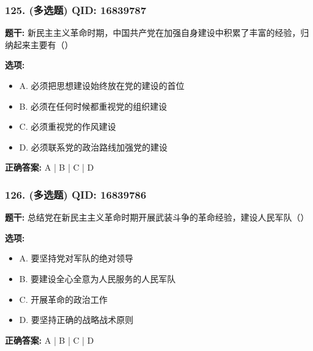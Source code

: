 \documentclass[12pt,UTF8]{ctexart}
\begin{document}
\subsubsection*{125. (多选题) \small QID: 16839787}

\textbf{题干:}
新民主主义革命时期，中国共产党在加强自身建设中积累了丰富的经验，归纳起来主要有（）

\textbf{选项:}
\begin{itemize}[leftmargin=*]

  \item A. 必须把思想建设始终放在党的建设的首位

  \item B. 必须在任何时候都重视党的组织建设

  \item C. 必须重视党的作风建设

  \item D. 必须联系党的政治路线加强党的建设

\end{itemize}

\textbf{正确答案:}
A | B | C | D

\vspace{0.3em}\hrulefill\vspace{0.7em}

\subsubsection*{126. (多选题) \small QID: 16839786}

\textbf{题干:}
总结党在新民主主义革命时期开展武装斗争的革命经验，建设人民军队（）

\textbf{选项:}
\begin{itemize}[leftmargin=*]

  \item A. 要坚持党对军队的绝对领导

  \item B. 要建设全心全意为人民服务的人民军队

  \item C. 开展革命的政治工作

  \item D. 要坚持正确的战略战术原则

\end{itemize}

\textbf{正确答案:}
A | B | C | D

\vspace{0.3em}\hrulefill\vspace{0.7em}
\end{document}

